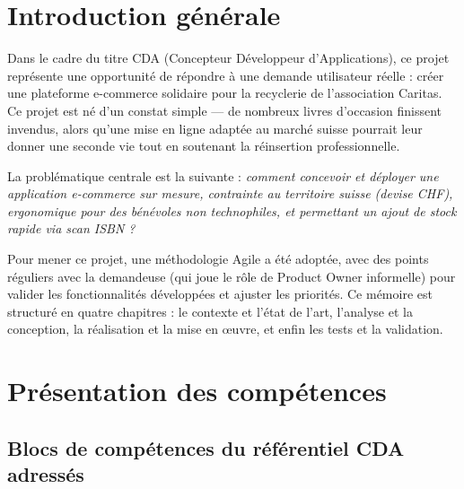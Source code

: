 \documentclass[12pt, a4paper]{report}
\renewcommand{\_}{\origunderscore\allowbreak}
\begin{document}
\listoffigures
\newpage

\chapter*{Introduction générale}

\noindent Dans le cadre du titre CDA (Concepteur Développeur d'Applications), ce projet représente une opportunité de répondre à une demande utilisateur réelle : créer une plateforme e-commerce solidaire pour la recyclerie de l'association Caritas. Ce projet est né d'un constat simple — de nombreux livres d'occasion finissent invendus, alors qu'une mise en ligne adaptée au marché suisse pourrait leur donner une seconde vie tout en soutenant la réinsertion professionnelle.

\noindent La problématique centrale est la suivante : \textit{comment concevoir et déployer une application e-commerce sur mesure, contrainte au territoire suisse (devise CHF), ergonomique pour des bénévoles non technophiles, et permettant un ajout de stock rapide via scan ISBN ?}

\noindent Pour mener ce projet, une méthodologie Agile a été adoptée, avec des points réguliers avec la demandeuse (qui joue le rôle de Product Owner informelle) pour valider les fonctionnalités développées et ajuster les priorités. Ce mémoire est structuré en quatre chapitres : le contexte et l'état de l'art, l'analyse et la conception, la réalisation et la mise en \oe{}uvre, et enfin les tests et la validation.


\chapter{Présentation des compétences}

\section{Blocs de compétences du référentiel CDA adressés}
\end{document}
